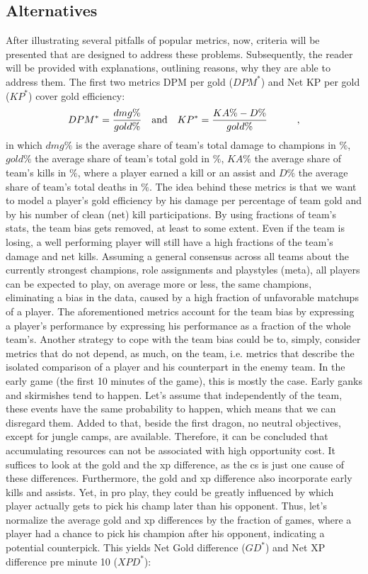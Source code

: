 \documentclass{article}
\begin{document}
\subsection{Alternatives}
After illustrating several pitfalls of popular metrics, now, criteria will be presented that are designed to address these problems. Subsequently, the reader will be provided with explanations, outlining reasons, why they are able to address them. \newline The first two metrics DPM per gold ($DPM^*$) and Net KP per gold ($KP^*$) cover gold efficiency:
\begin{equation}
DPM^* = \frac{dmg \%}{gold \%} \quad\mathrm{and}\quad 
KP^* =  \frac{KA \% - D \%}{gold \%} \indent \indent ,
\end{equation}
in which $dmg\%$ is the average share of team's total damage to champions in $\%$, 
$gold\%$ the average share of team's total gold in $\%$, 
$KA\%$ the average share of team's kills in $\%$, where a player earned a kill or an assist and
$D\%$ the average share of team's total deaths in $\%$.
\newline 
The idea behind these metrics is that we want to model a player's gold efficiency by his damage per percentage of team gold and by his number of clean (net) kill participations. By using fractions of team's stats, the team bias gets removed, at least to some extent. Even if the team is losing, a well performing player will still have a high fractions of the team's damage and net kills. Assuming a general consensus across all teams about the currently strongest champions, role assignments and playstyles (meta), all players can be expected to play, on average more or less, the same champions, eliminating a bias in the data, caused by a high fraction of unfavorable matchups of a player.  \newline
The aforementioned metrics account for the team bias by expressing a player's performance by expressing his performance as a fraction of the whole team's. Another strategy to cope with the team bias could be to, simply, consider metrics that do not depend, as much, on the team, i.e. metrics that describe the isolated comparison of a player and his counterpart in the enemy team. In the early game (the first 10 minutes of the game), this is mostly the case. Early ganks and skirmishes tend to happen. Let's assume that independently of the team, these events have the same probability to happen, which means that we can disregard them. Added to that, beside the first dragon, no neutral objectives, except for jungle camps, are available. Therefore, it can be concluded that accumulating resources can not be associated with high opportunity cost. It suffices to look at the gold and the xp difference, as the cs is just one cause of these differences. Furthermore, the gold and xp difference also incorporate early kills and assists. Yet, in pro play, they could be greatly influenced by which player actually gets to pick his champ later than his opponent. Thus, let's normalize the average gold and xp differences by the fraction of games, where a player had a chance to pick his champion after his opponent, indicating a potential counterpick. This yields Net Gold difference ($GD^*$) and Net XP difference pre minute 10 ($XPD^*$):
\end{document}

